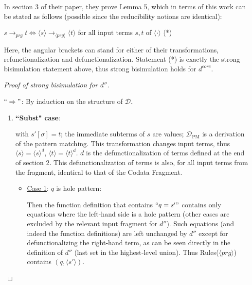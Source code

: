 \documentclass[11pt]{article} %
\begin{document}
In section 3 of their paper, they prove Lemma 5, which in terms of this work can be stated as follows (possible since the reducibility notions are identical):

$s \longrightarrow_{prg} t \iff \langle s \rangle \longrightarrow_{\langle prg \rangle} \langle t \rangle$ for all input terms $s,t$ of $\langle \cdot \rangle$ (*)

Here, the angular brackets can stand for either of their transformations, refunctionalization and defunctionalization. Statement (*) is exactly the strong bisimulation statement above, thus strong bisimulation holds for $d^{core}$.

\begin{proof}[Proof of strong bisimulation for $d''$] ~

$`` \Rightarrow "$: By induction on the structure of $\mathcal{D}$.

\begin{enumerate}
\item \textbf{``Subst" case}:

\begin{prooftree}
\end{prooftree}

with $s'[\sigma] = t$; the immediate subterms of $s$ are values; $\mathcal{D}_{\textrm{PM}}$ is a derivation of the pattern matching. This transformation changes input terms, thus $\langle s \rangle = \langle s \rangle^d$, $\langle t \rangle = \langle t \rangle^d$. $d$ is the defunctionalization of terms defined at the end of section 2. This defunctionalization of terms is also, for all input terms from the fragment, identical to that of the Codata Fragment.

\begin{itemize}

\item \underline{Case 1}: $q$ is hole pattern:

Then the function definition that contains $`` q = s' "$ contains only equations where the left-hand side is a hole pattern (other cases are excluded by the relevant input fragment for $d''$). Such equations (and indeed the function definitions) are left unchanged by $d''$ except for defunctionalizing the right-hand term, as can be seen directly in the definition of $d''$ (last set in the highest-level union). Thus Rules($\langle prg \rangle$) contains $(q, \langle s' \rangle)$.


\end{itemize}
\end{enumerate}
\end{proof}
\end{document}
